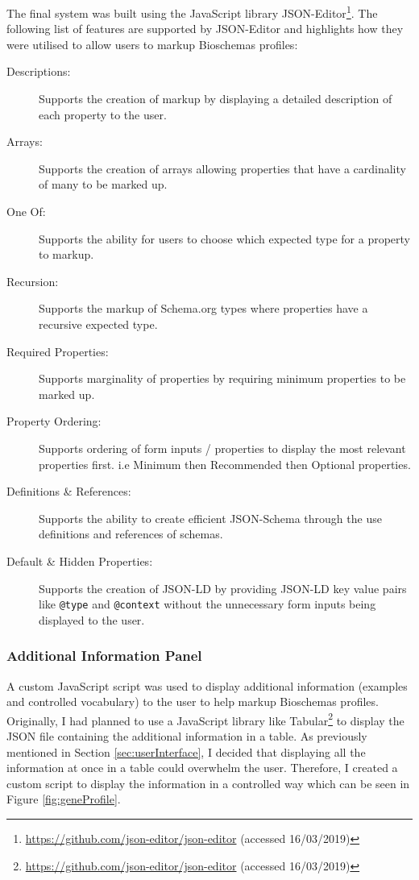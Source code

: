 \newpage
The final system was built using the JavaScript library JSON-Editor\footnote{\url{https://github.com/json-editor/json-editor} (accessed 16/03/2019)}. The following list of features are supported by JSON-Editor and highlights how they were utilised to allow users to markup Bioschemas profiles:

{
\begin{description}
  \item[Descriptions: ]
  Supports the creation of markup by displaying a detailed description of each property to the user.
  \item[Arrays: ]
  Supports the creation of arrays allowing properties that have a cardinality of many to be marked up. 
  \item[One Of: ]
  Supports the ability for users to choose which expected type for a property to markup.
  \item[Recursion: ]
  Supports the markup of Schema.org types where properties have a recursive expected type.
  \item[Required Properties: ]
  Supports marginality of properties by requiring minimum properties to be marked up.
  \item[Property Ordering: ]
  Supports ordering of form inputs / properties to display the most relevant properties first. i.e Minimum then Recommended then Optional properties.
  \item[Definitions \& References: ]
  Supports the ability to create efficient JSON-Schema through the use definitions and references of schemas.
  \item[Default \& Hidden Properties: ]
  Supports the creation of JSON-LD by providing JSON-LD key value pairs like \texttt{@type} and \texttt{@context} without the unnecessary form inputs being displayed to the user.
\end{description}
}

\subsubsection{Additional Information Panel} \label{sec:additionalinformation}
A custom JavaScript script was used to display additional information (examples and controlled vocabulary) to the user to help markup Bioschemas profiles. Originally, I had planned to use a JavaScript library like Tabular\footnote{\url{https://github.com/json-editor/json-editor} (accessed 16/03/2019)} to display the JSON file containing the additional information in a table. As previously mentioned in Section \ref{sec:userInterface}, I decided that displaying all the information at once in a table could overwhelm the user. Therefore, I created a custom script to display the information in a controlled way which can be seen in Figure \ref{fig:geneProfile}.

